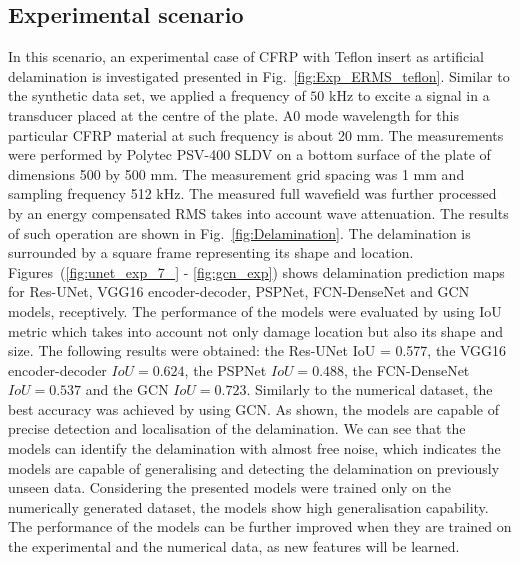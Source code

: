 \documentclass[runningheads]{llncs}
\begin{document}
\subsection{Experimental scenario}
In this scenario, an experimental case of CFRP with Teflon insert as artificial delamination is investigated presented in Fig.~\ref{fig:Exp_ERMS_teflon}. 
Similar to the synthetic data set, we applied a frequency of \(50\) kHz to excite a signal in a transducer placed at the centre of the plate. 
A0 mode wavelength for this particular CFRP material at such frequency is about 20 mm. 
The measurements were performed by Polytec PSV-400 SLDV on a bottom surface of the plate of dimensions 500 by 500 mm. 
The measurement grid spacing was 1 mm and sampling frequency 512 kHz. 
The measured full wavefield was further processed by an energy compensated RMS takes into account wave attenuation. 
The results of such operation are shown in Fig.~\ref{fig:Delamination}.
The delamination is surrounded by a square frame representing its shape and location. 
Figures~(\ref{fig:unet_exp_7_} - \ref{fig:gcn_exp}) shows delamination prediction maps for Res-UNet, VGG16 encoder-decoder, PSPNet, FCN-DenseNet and GCN models, receptively.
The performance of the models were evaluated by using IoU metric which takes into account not only damage location but also its shape and size. 
The following results were obtained: the Res-UNet IoU = 0.577, the VGG16 encoder-decoder \(IoU = 0.624\), the
PSPNet \(IoU = 0.488\), the FCN-DenseNet \(IoU = 0.537\) and the GCN \(IoU =
0.723\). 
Similarly to the numerical dataset, the best accuracy was achieved by using GCN.
As shown, the models are capable of precise detection and localisation of the delamination. 
We can see that the models can identify the delamination with almost free noise, which indicates the models are capable of generalising and detecting the delamination on previously unseen data. 
Considering the presented models were trained only on the numerically generated dataset, the models show high generalisation capability.
The performance of the models can be further improved when they are trained on the experimental and the numerical data, as new features will be learned. 
\end{document}
